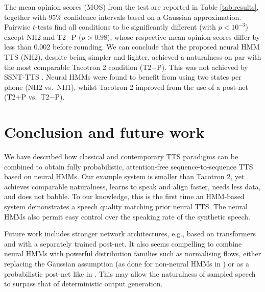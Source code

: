 \documentclass[british]{article}
\newcommand{\tcp}{T2$+$P}
\newcommand{\tcnop}{T2$-$P}
\newcommand{\nhtwo}{NH2}
\newcommand{\nhone}{NH1}
\begin{document}
The mean opinion scores (MOS) from the test are reported in Table \ref{tab:results}, together with 95\% confidence intervals based on a Gaussian approximation.
Pairwise $t$-tests find all conditions to be significantly different (with $p{<}10^{-3}$) except \nhtwo{} and \tcnop{} ($p{>}0.98$),
whose respective mean opinion scores differ by less than 0.002 before rounding.
We can conclude that the proposed neural HMM TTS (\nhtwo{}), despite being simpler and lighter, achieved a naturalness on par with the most comparable Tacotron 2 condition (\tcnop{}).
This was not achieved by SSNT-TTS \cite{yasuda2019initial}.
Neural HMMs were found to benefit from using two states per phone (\nhtwo{} vs.\ \nhone{}), whilst
Tacotron 2 improved from the use of a post-net (\tcp{} vs.\ \tcnop{}).



\section{Conclusion and future work}
\label{sec:conclusion}
We have described how classical and contemporary TTS paradigms can be combined to obtain fully probabilistic, attention-free sequence-to-sequence TTS based on neural HMMs.
Our example system is smaller than Tacotron 2, yet achieves comparable naturalness, learns to speak and align faster, needs less data, and does not babble.
To our knowledge, this is the first time an HMM-based system demonstrates a speech quality matching prior neural TTS.
The neural HMMs also permit easy control over the speaking rate of the synthetic speech.

Future work includes stronger network architectures, e.g., based on transformers
and with a separately trained post-net.
It also seems compelling to combine neural HMMs with powerful distribution families such as normalising flows, either replacing the Gaussian assumption (as done for non-neural HMMs in \cite{ghosh2021normalizing}) or as a probabilistic post-net like in \cite{kim2020glow}.
This may allow the naturalness of sampled speech to surpass that of deterministic output generation.



\end{document}
